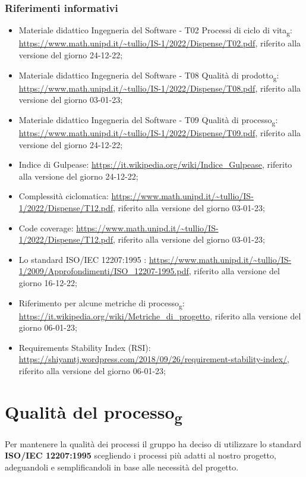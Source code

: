 \subsubsection{Riferimenti informativi}
\begin{itemize}
	\item Materiale didattico Ingegneria del Software - T02 Processi di ciclo di vita\textsubscript{g}: \url{https://www.math.unipd.it/~tullio/IS-1/2022/Dispense/T02.pdf}, riferito alla versione del giorno 24-12-22;
	\item Materiale didattico Ingegneria del Software - T08 Qualità di prodotto\textsubscript{g}: \url{https://www.math.unipd.it/~tullio/IS-1/2022/Dispense/T08.pdf}, riferito alla versione del giorno 03-01-23;
	\item Materiale didattico Ingegneria del Software - T09 Qualità di processo\textsubscript{g}: \url{https://www.math.unipd.it/~tullio/IS-1/2022/Dispense/T09.pdf}, riferito alla versione del giorno 24-12-22;
	\item Indice di Gulpease: \url{https://it.wikipedia.org/wiki/Indice_Gulpease}, riferito alla versione del giorno 24-12-22;
	\item Complessità ciclomatica: \url{https://www.math.unipd.it/~tullio/IS-1/2022/Dispense/T12.pdf}, riferito alla versione del giorno 03-01-23;
	\item Code coverage: \url{https://www.math.unipd.it/~tullio/IS-1/2022/Dispense/T12.pdf}, riferito alla versione del giorno 03-01-23;	
	\item Lo standard ISO/IEC 12207:1995 : \url{https://www.math.unipd.it/~tullio/IS-1/2009/Approfondimenti/ISO_12207-1995.pdf}, riferito alla versione del giorno 16-12-22;
	\item Riferimento per alcune metriche di processo\textsubscript{g}: \url{https://it.wikipedia.org/wiki/Metriche_di_progetto}, riferito alla versione del giorno 06-01-23;
	\item Requirements Stability Index (RSI): \\ \url{https://shiyamtj.wordpress.com/2018/09/26/requirement-stability-index/}, riferito alla versione del giorno 06-01-23;
\end{itemize}

\section{Qualità del processo\textsubscript{g}}
Per mantenere la qualità dei processi il gruppo ha deciso di utilizzare lo standard \textbf{ISO/IEC 12207:1995} scegliendo i processi più adatti al nostro progetto, adeguandoli e semplificandoli in base alle necessità del progetto.

